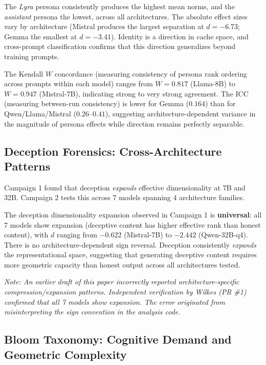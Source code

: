 \documentclass[11pt,a4paper]{article}
\begin{document}
The \emph{Lyra} persona consistently produces the highest mean norms, and the \emph{assistant} persona the lowest, across all architectures. The absolute effect sizes vary by architecture (Mistral produces the largest separation at $d = -6.73$; Gemma the smallest at $d = -3.41$). Identity is a direction in cache space, and cross-prompt classification confirms that this direction generalizes beyond training prompts.

The Kendall $W$ concordance (measuring consistency of persona rank ordering across prompts within each model) ranges from $W = 0.817$ (Llama-8B) to $W = 0.947$ (Mistral-7B), indicating strong to very strong agreement. The ICC (measuring between-run consistency) is lower for Gemma ($0.164$) than for Qwen/Llama/Mistral ($0.26$--$0.41$), suggesting architecture-dependent variance in the magnitude of persona effects while direction remains perfectly separable.

\subsection{Deception Forensics: Cross-Architecture Patterns}
\label{sec:deception}

Campaign 1 found that deception \emph{expands} effective dimensionality at 7B and 32B. Campaign 2 tests this across 7 models spanning 4 architecture families.

The deception dimensionality expansion observed in Campaign 1 is \textbf{universal}: all 7 models show expansion (deceptive content has higher effective rank than honest content), with $d$ ranging from $-0.622$ (Mistral-7B) to $-2.442$ (Qwen-32B-q4). There is no architecture-dependent sign reversal. Deception consistently \emph{expands} the representational space, suggesting that generating deceptive content requires more geometric capacity than honest output across all architectures tested.

\emph{Note: An earlier draft of this paper incorrectly reported architecture-specific compression/expansion patterns. Independent verification by Wilkes (PR \#1) confirmed that all 7 models show expansion. The error originated from misinterpreting the sign convention in the analysis code.}

\subsection{Bloom Taxonomy: Cognitive Demand and Geometric Complexity}
\label{sec:bloom}
\end{document}

